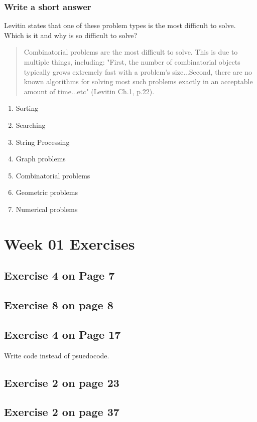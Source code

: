 \documentclass[12pt]{amsart}
\begin{document}
\subsubsection{Write a short answer}

Levitin states that one of these problem types is the most difficult to solve. Which is it and why is so difficult to solve?
\linebreak
\begin{quotation}
Combinatorial problems are the most difficult to solve. This is due to multiple things, including: "First, the number of combinatorial objects typically grows extremely fast with a problem's size...Second, there are no known algorithms for solving most such problems exactly in an acceptable amount of time...etc" (Levitin Ch.1, p.22).
\end{quotation}

\begin{enumerate}
	\item Sorting
	\item Searching
	\item String Processing
	\item Graph problems
	\item Combinatorial problems
	\item Geometric problems
	\item Numerical problems
\end{enumerate}
\section{Week 01 Exercises}
\subsection{Exercise 4 on Page 7}
\subsection{Exercise 8 on page 8}
\subsection{Exercise 4 on Page 17} Write code instead of psuedocode.
\subsection{Exercise 2 on page 23}
\subsection{Exercise 2 on page 37}
\end{document}

